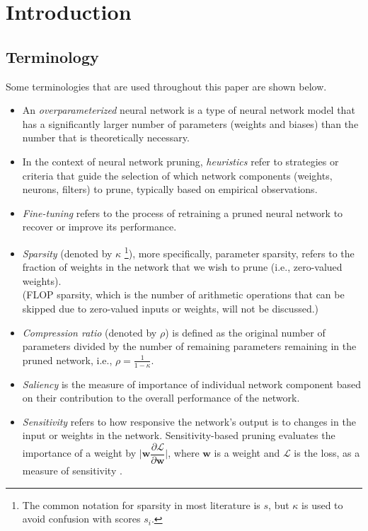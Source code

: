 
\chapter{Introduction}
\vspace{1em}

\section{Terminology}
Some terminologies that are used throughout this paper are shown below.
\begin{itemize}
    \item An \textit{overparameterized} neural network is a type of neural network model that has a significantly larger number of parameters (weights and biases) than the number that is theoretically necessary.
    \item In the context of neural network pruning, \textit{heuristics} refer to strategies or criteria that guide the selection of which network components (weights, neurons, filters) to prune, typically based on empirical observations.
    \item \textit{Fine-tuning} refers to the process of retraining a pruned neural network to recover or improve its performance.
    \item \textit{Sparsity} (denoted by $\kappa$ \footnote{The common notation for sparsity in most literature is $s$, but $\kappa$ is used to avoid confusion with scores $s_i$.}), more specifically, parameter sparsity, refers to the fraction of weights in the network that we wish to prune (i.e., zero-valued weights).\\
    (FLOP sparsity, which is the number of arithmetic operations that can be skipped due to zero-valued inputs or weights, will not be discussed.)
    \item \textit{Compression ratio} (denoted by $\rho$) is defined as the original number of parameters divided by the number of remaining parameters remaining in the pruned network, i.e., $\rho = \frac{1}{1-\kappa}$.
    \item \textit{Saliency} is the measure of importance of individual network component based on their contribution to the overall performance of the network.
    \item \textit{Sensitivity} refers to how responsive the network's output is to changes in the input or weights in the network. Sensitivity-based pruning evaluates the importance of a weight by $\Big| \textbf{w} \dfrac{\partial \mathcal{L}}{\partial \textbf{w}}\Big|$, where $\textbf{w}$ is a weight and $\mathcal{L}$ is the loss, as a measure of sensitivity \autocite{hayou21}.

\end{itemize}
